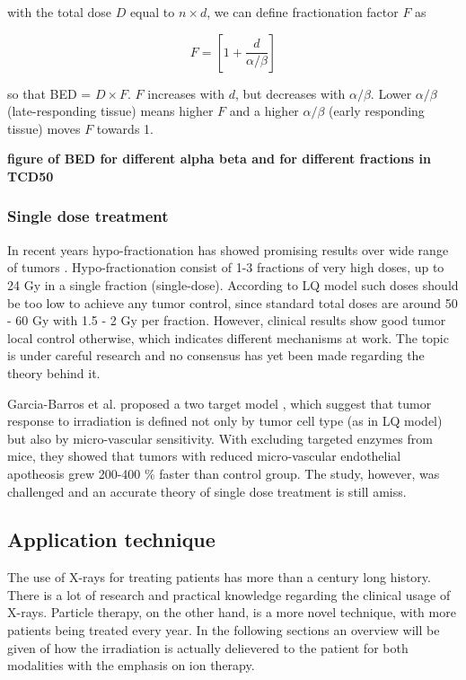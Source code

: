 \documentclass[type=dr, dr=rernat, accentcolor=tud7b,colorbacktitle, bigchapter, openright, twoside, 12pt ]{tudthesis}
\begin{document}
with the total dose $D$ equal to $n \times d$, we can define fractionation factor $F$ as

\begin{equation}
 F = \left[1 + \frac{d}{\alpha / \beta} \right]
\end{equation}

so that BED = $D \times F$. $F$ increases with $d$, but decreases with $\alpha / \beta$. Lower $\alpha / \beta$ (late-responding tissue)
means higher $F$ and a higher $\alpha / \beta$ (early responding tissue) moves $F$ towards 1.

\textbf{figure of BED for different alpha beta and for different fractions in TCD50}


\subsubsection{Single dose treatment}

In recent years hypo-fractionation has showed promising results over wide range of tumors \cite{Yamada2008, Greco2011, Halasz2013}. 
Hypo-fractionation consist of 1-3 fractions of very high doses, up to 24 Gy in a single fraction (single-dose). According to LQ model such doses should be too low to achieve any tumor control, since standard total doses are around 50 - 60 Gy with 1.5 - 2 Gy per fraction. 
However, clinical results show good tumor local control otherwise, which indicates different mechanisms at work. The topic is under careful research and no consensus has yet been made regarding the theory behind it.

Garcia-Barros et al. proposed a two target model \cite{Garcia2003}, which suggest that tumor response to irradiation is defined not only by tumor cell type (as in LQ model) but also by micro-vascular
sensitivity. With excluding targeted enzymes from mice, they showed that tumors with reduced micro-vascular endothelial apotheosis grew 200-400 \% faster than control group. The study, however, was challenged
and an accurate theory of single dose treatment is still amiss.
  

\subsection{Application technique}

The use of X-rays for treating patients has more than a century long history. There is a lot of research and practical knowledge regarding the clinical usage of X-rays. Particle therapy, on the other hand, is a more novel technique, with
more patients being treated every year. In the following sections an overview will be given of how the irradiation is actually delievered to the patient for both modalities with the emphasis on ion therapy.
\end{document}
